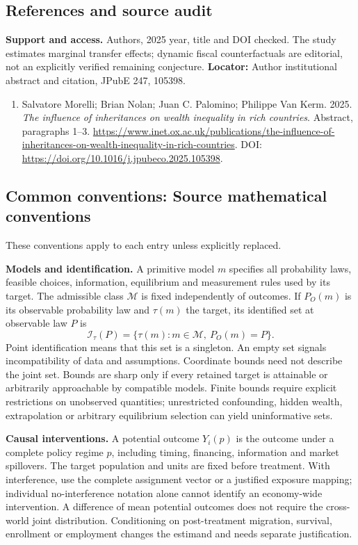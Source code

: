 \documentclass[11pt,a4paper]{article}
\begin{document}
\subsection*{References and source audit}
\textbf{Support and access.} Authors, 2025 year, title and DOI checked. The study estimates marginal transfer effects; dynamic fiscal counterfactuals are editorial, not an explicitly verified remaining conjecture. \textbf{Locator:} Author institutional abstract and citation, JPubE 247, 105398.
\begin{enumerate}\raggedright
\item\hypertarget{definitions:source:30007651:1}{} Salvatore Morelli; Brian Nolan; Juan C. Palomino; Philippe Van Kerm. 2025. \emph{The influence of inheritances on wealth inequality in rich countries}. Abstract, paragraphs 1–3.
\url{https://www.inet.ox.ac.uk/publications/the-influence-of-inheritances-on-wealth-inequality-in-rich-countries}.
DOI: \url{https://doi.org/10.1016/j.jpubeco.2025.105398}.
\end{enumerate}

\subsection*{Common conventions: Source mathematical conventions}

These conventions apply to each entry unless explicitly replaced.

\textbf{Models and identification.} A primitive model \(m\) specifies all probability laws, feasible choices, information, equilibrium and measurement rules used by its target. The admissible class \(\mathcal M\) is fixed independently of outcomes. If \(P_O(m)\) is its observable probability law and \(\tau(m)\) the target, its identified set at observable law \(P\) is
\[
 \mathcal I_\tau(P)=\{\tau(m):m\in\mathcal M,\ P_O(m)=P\}.
\]
Point identification means that this set is a singleton. An empty set signals incompatibility of data and assumptions. Coordinate bounds need not describe the joint set. Bounds are sharp only if every retained target is attainable or arbitrarily approachable by compatible models. Finite bounds require explicit restrictions on unobserved quantities; unrestricted confounding, hidden wealth, extrapolation or arbitrary equilibrium selection can yield uninformative sets.

\textbf{Causal interventions.} A potential outcome \(Y_i(p)\) is the outcome under a complete policy regime \(p\), including timing, financing, information and market spillovers. The target population and units are fixed before treatment. With interference, use the complete assignment vector or a justified exposure mapping; individual no-interference notation alone cannot identify an economy-wide intervention. A difference of mean potential outcomes does not require the cross-world joint distribution. Conditioning on post-treatment migration, survival, enrollment or employment changes the estimand and needs separate justification.
\end{document}
